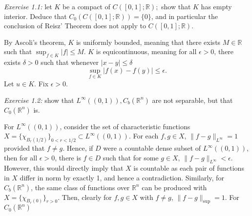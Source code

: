\documentclass{article}
\newcommand{\problem}[2]{
\vspace{0.2in}\begin{mdframed}[
  backgroundcolor=problem,
  skipabove=\topsep,
  skipbelow=\topsep
  ]
  \emph{Exercise {#1}:} {#2}
\end{mdframed}}
\newcommand{\R}{\mathbb{R}}
\begin{document}
    \problem{1.1}{let $K$ be a compact of $C([0,1];\R);$ show that $K$ has empty interior. Deduce that $C_0(C([0,1];\R)) = \{0\}$, and in particular the conclusion of Reisz' Theorem does not apply to $C([0,1]; \R)$.}
    By Ascoli's theorem, $K$ is uniformly bounded, meaning that there exists $M\in \R$ such that $\sup_{f\in K}|f|\le M$. $K$ is equicontinuous, meaning for all $\epsilon > 0$, there exists $\delta > 0$ such that whenever $|x-y|\le\delta$
    \[ \sup_{f\in K}|f(x)-f(y)| \le \epsilon.\]
    Let $u\in K$. Fix $\epsilon > 0$. 
    \problem{1.2}{show that $L^\infty((0,1)), C_b(\R^n)$ are not separable, but that $C_0(\R^n)$ is.}
    For $L^\infty((0,1))$, consider the set of characteristic functions $X=\{\chi_{B_r(1/2)}\}_{0< r < 1/2}\subset L^\infty((0,1))$. For each $f,g\in X$, $\|f-g\|_{L^\infty} = 1$ provided that $f\ne g$. Hence, if $D$ were a countable dense subset of $L^\infty((0,1))$, then for all $\epsilon > 0$, there is $f\in D$ such that for some $g\in X$, $\|f-g\|_{L^\infty} < \epsilon$. However, this would directly imply that $X$ is countable as each pair of functions in $X$ differ in norm by exactly 1, and hence a contradiction.\newline
    Similarly, for $C_b(\R^n)$, the same class of functions over $\R^n$ can be produced with $X=\{\chi_{B_r(0)}\}_{r > 0}$. Then, clearly for $f,g\in X$ with $f\ne g$, $\|f-g\|_{\sup} = 1$.\newline
    For $C_0(\R^n)$
\end{document}

